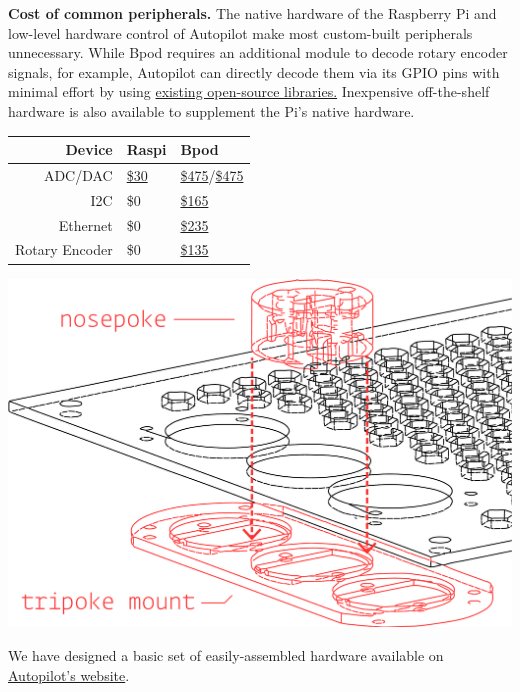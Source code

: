 \begin{margintable}[0.3cm]
\caption{
\textbf{Cost of common peripherals.} The native hardware of the Raspberry Pi and low-level hardware control of Autopilot make most custom-built peripherals unnecessary. While Bpod requires an additional module to decode rotary encoder signals, for example, Autopilot can directly decode them via its GPIO pins with minimal effort by using \href{https://pypi.org/project/pigpio-encoder/}{existing open-source libraries.} Inexpensive off-the-shelf hardware is also available to supplement the Pi's native hardware.}
\label{tab:periphs}
\noindent\begin{tabularx}{\linewidth}{Rll}
\toprule
\textbf{Device} & Raspi & Bpod \\
\midrule
ADC/DAC & \href{https://www.seeedstudio.com/Raspberry-Pi-High-Precision-AD-DA-Board-p-2765.html}{\$30} &  \href{https://sanworks.io/shop/viewproduct?productID=1021}{\$475}/\href{https://sanworks.io/shop/viewproduct?productID=1013}{\$475}\\
I2C & \$0 & \href{https://sanworks.io/shop/viewproduct?productID=1019}{\$165} \\
Ethernet & \$0 & \href{https://sanworks.io/shop/viewproduct?productID=1025}{\$235} \\
Rotary Encoder & \$0 &  \href{https://sanworks.io/shop/viewproduct?productID=1022}{\$135}\\
\bottomrule
\end{tabularx}
\end{margintable}

\begin{marginfigure}[1cm]
\includegraphics[]{figures/pokeport.pdf}
\caption{We have designed a basic set of easily-assembled hardware available on \href{https://auto-pi-lot.com/hardware/}{Autopilot's website}.}
\label{fig:pokeport}
\end{marginfigure}%

